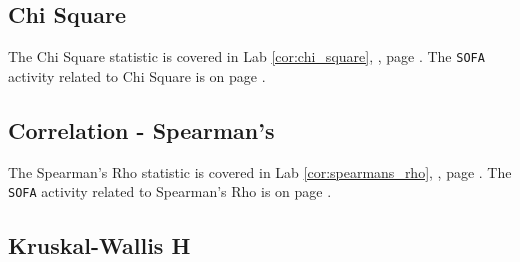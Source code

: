 \subsection{Chi Square}

The Chi Square statistic is covered in Lab \ref{cor:chi_square}, , page \pageref{cor:chi_square}. The \texttt{SOFA} activity related to Chi Square is on page \pageref{cor:chi_square_proc}.

\subsection{Correlation - Spearman's}

The Spearman's Rho statistic is covered in Lab \ref{cor:spearmans_rho}, , page \pageref{cor:spearmans_rho}. The \texttt{SOFA} activity related to Spearman's Rho is on page \pageref{cor:spearmans_rho_proc}.

\subsection{Kruskal-Wallis H}

